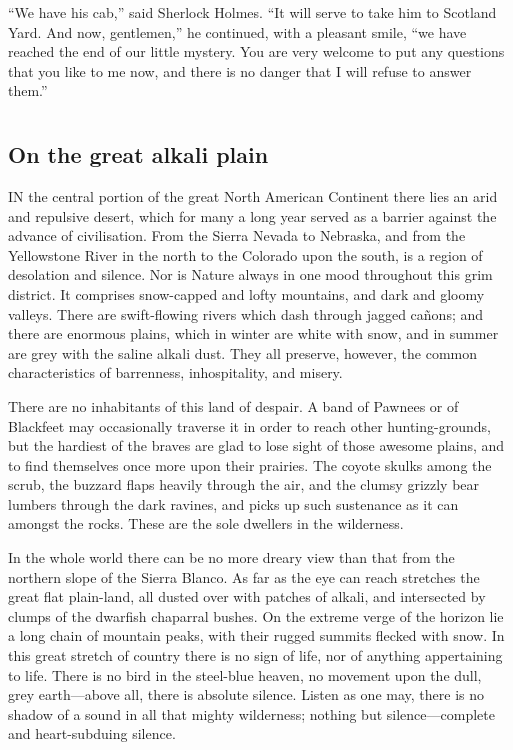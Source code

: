 \documentclass[12pt]{book}
\begin{document}
“We have his cab,” said Sherlock Holmes. “It will serve to take him to Scotland Yard. And now, gentlemen,” he continued, with a pleasant smile, “we have reached the end of our little mystery. You are very welcome to put any questions that you like to me now, and there is no danger that I will refuse to answer them.” 







\part{}






\chapter{On the great alkali plain} 

IN the central portion of the great North American Continent there lies an arid and repulsive desert, which for many a long year served as a barrier against the advance of civilisation. From the Sierra Nevada to Nebraska, and from the Yellowstone River in the north to the Colorado upon the south, is a region of desolation and silence. Nor is Nature always in one mood throughout this grim district. It comprises snow-capped and lofty mountains, and dark and gloomy valleys. There are swift-flowing rivers which dash through jagged cañons; and there are enormous plains, which in winter are white with snow, and in summer are grey with the saline alkali dust. They all preserve, however, the common characteristics of barrenness, inhospitality, and misery. 

There are no inhabitants of this land of despair. A band of Pawnees or of Blackfeet may occasionally traverse it in order to reach other hunting-grounds, but the hardiest of the braves are glad to lose sight of those awesome plains, and to find themselves once more upon their prairies. The coyote skulks among the scrub, the buzzard flaps heavily through the air, and the clumsy grizzly bear lumbers through the dark ravines, and picks up such sustenance as it can amongst the rocks. These are the sole dwellers in the wilderness. 

In the whole world there can be no more dreary view than that from the northern slope of the Sierra Blanco. As far as the eye can reach stretches the great flat plain-land, all dusted over with patches of alkali, and intersected by clumps of the dwarfish chaparral bushes. On the extreme verge of the horizon lie a long chain of mountain peaks, with their rugged summits flecked with snow. In this great stretch of country there is no sign of life, nor of anything appertaining to life. There is no bird in the steel-blue heaven, no movement upon the dull, grey earth—above all, there is absolute silence. Listen as one may, there is no shadow of a sound in all that mighty wilderness; nothing but silence—complete and heart-subduing silence. 
\end{document}
